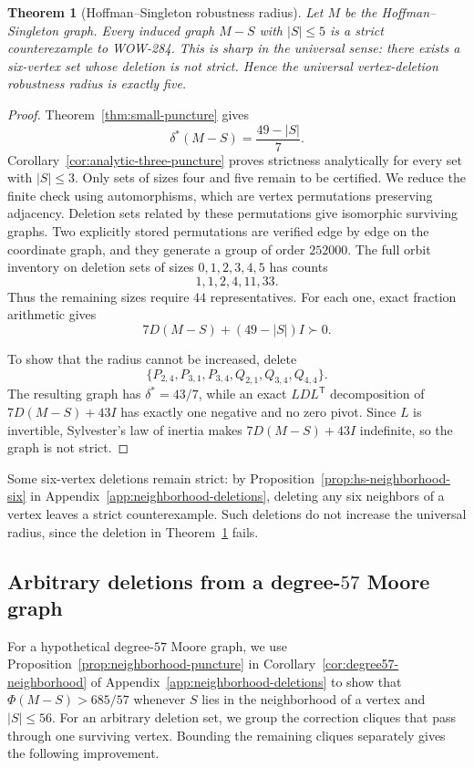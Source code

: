 \documentclass[a4paper,10pt,reqno]{amsart}
\theoremstyle{plain}
\newtheorem{theorem}{Theorem}[section]
\theoremstyle{definition}
\theoremstyle{remark}
\begin{document}
\begin{theorem}[Hoffman--Singleton robustness radius]\label{thm:hs-radius}
Let \(M\) be the Hoffman--Singleton graph.  Every induced graph \(M-S\) with
\(|S|\le5\) is a strict counterexample to WOW-284.  This is sharp in the
universal sense: there exists a six-vertex set whose deletion is not strict.
Hence the universal vertex-deletion robustness radius is exactly five.
\end{theorem}

\begin{proof}
Theorem~\ref{thm:small-puncture} gives
\[
 \delta^*(M-S)=\frac{49-|S|}{7}.
\]
Corollary~\ref{cor:analytic-three-puncture} proves strictness analytically
for every set with \(|S|\le3\).  Only sets of sizes four and five remain
to be certified. We reduce the finite check using automorphisms, which are
vertex permutations preserving adjacency. Deletion sets related by these
permutations give isomorphic surviving graphs. Two explicitly stored
permutations are verified edge by edge on the coordinate graph, and they
generate a group of order \(252000\).  The full orbit
inventory on deletion sets of sizes \(0,1,2,3,4,5\) has counts
\[
 1,1,2,4,11,33.
\]
Thus the remaining sizes require \(44\) representatives.  For each one,
exact fraction arithmetic gives
\[
 7D(M-S)+(49-|S|)I\succ0.
\]

To show that the radius cannot be increased, delete
\[
 \{P_{2,4},P_{3,1},P_{3,4},Q_{2,1},Q_{3,4},Q_{4,4}\}.
\]
The resulting graph has \(\delta^*=43/7\), while an exact
\(LDL^{\mathsf T}\) decomposition of \(7D(M-S)+43I\) has exactly one negative
and no zero pivot.  Since \(L\) is invertible, Sylvester's law of inertia makes
\(7D(M-S)+43I\) indefinite, so the graph is not strict.
\end{proof}

Some six-vertex deletions remain strict: by
Proposition~\ref{prop:hs-neighborhood-six} in
Appendix~\ref{app:neighborhood-deletions}, deleting any six neighbors of a
vertex leaves a strict counterexample. Such deletions do not increase the
universal radius, since the deletion in Theorem~\ref{thm:hs-radius} fails.

\subsection{Arbitrary deletions from a degree-\texorpdfstring{\(57\)}{57} Moore graph}

For a hypothetical degree-\(57\) Moore graph, we use
Proposition~\ref{prop:neighborhood-puncture} in
Corollary~\ref{cor:degree57-neighborhood} of
Appendix~\ref{app:neighborhood-deletions} to show that
\(\Phi(M-S)>685/57\) whenever \(S\) lies in the neighborhood of a vertex and
\(|S|\le56\).
For an arbitrary deletion set, we group the correction cliques that pass
through one surviving vertex. Bounding the remaining cliques separately
gives the following improvement.
\end{document}

